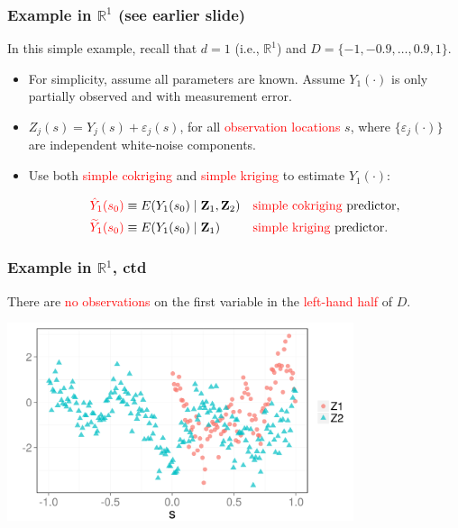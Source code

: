 \documentclass{beamer}
\newcommand{\Zvec}{\mathbf{Z}}
\newcommand{\E}{E}
\begin{document}

\begin{frame}
\frametitle{Example in $\mathbb{R}^1$ (see earlier slide)}
In this simple example, recall that $d=1$ (i.e., $\mathbb{R}^1$) and $D=\{-1,-0.9,\ldots,0.9,1\}$.
\begin{itemize}
\item For simplicity, assume all parameters are known. Assume $Y_1(\cdot)$ is only partially observed and with measurement error.
\item $Z_j(s)=Y_j(s)+\varepsilon_j(s)$, for all \textcolor{red}{observation locations} $s$, where $\{\varepsilon_j(\cdot)\}$ are independent white-noise components.
\item Use both \textcolor{red}{simple cokriging} and \textcolor{red}{simple kriging} to estimate $Y_1(\cdot)$:

\begin{align*}
\textcolor{red}{\hat Y_1(s_0)} &\equiv \E(Y_1(s_0) \mid  \Zvec_1, \Zvec_2)&&\textrm{\textcolor{red}{simple cokriging} predictor}, \\
\textcolor{red}{\widetilde Y_1(s_0)} &\equiv \E(Y_1(s_0) \mid  \Zvec_1)&&\textrm{\textcolor{red}{simple kriging} predictor}.
\end{align*}\vfill
\end{itemize}

\end{frame}


\begin{frame}
\frametitle{Example in $\mathbb{R}^1$, ctd}
There are \textcolor{red}{no observations} on the first variable in the \textcolor{red}{left-hand half} of $D$.
\begin{center}
\includegraphics[width=4in]{./sim_obs.png}
\end{center}
\end{frame}

\end{document}
